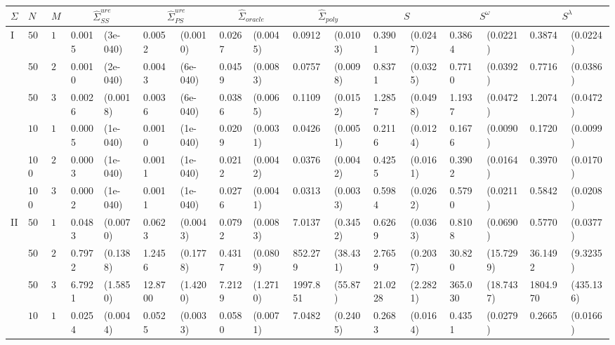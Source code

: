 \begin{table}[H]
\centering
\begin{footnotesize}
\begin{tabular}{lllllllllllllllll}
$\Sigma$ & $N$ & $M$ & \multicolumn{2}{c}{$\hat{\Sigma}^{ure}_{SS}$} &  \multicolumn{2}{c}{$\hat{\Sigma}^{ure}_{PS}$} &  \multicolumn{2}{c}{$\hat{\Sigma}_{oracle}$}   &  \multicolumn{2}{c}{$\hat{\Sigma}_{poly}$}  &  \multicolumn{2}{c}{$S$}   &  \multicolumn{2}{c}{$S^\omega$}   &  \multicolumn{2}{c}{$S^\lambda$}   \\ 
  \hline
I & $50$ & $10$ & 0.0015 & (3e-040) & 0.0052 & (0.0010) & 0.0267 & (0.0045) & 0.0912 & (0.0103) & 0.3901 & (0.0247) & 0.3864 & (0.0221) & 0.3874 & (0.0224) \\ 
    &  50 & $20$ & 0.0010 & (2e-040) & 0.0043 & (6e-040) & 0.0459 & (0.0083) & 0.0757 & (0.0098) & 0.8371 & (0.0325) & 0.7710 & (0.0392) & 0.7716 & (0.0386) \\ 
    & 50  & $30$ & 0.0026 & (0.0018) & 0.0036 & (6e-040) & 0.0386 & (0.0065) & 0.1109 & (0.0152) & 1.2857 & (0.0498) & 1.1937 & (0.0472) & 1.2074 & (0.0472) \\ 
    & $100$ & $10$ & 0.0005 & (1e-040) & 0.0010 & (1e-040) & 0.0209 & (0.0031) & 0.0426 & (0.0051) & 0.2116 & (0.0124) & 0.1676 & (0.0090) & 0.1720 & (0.0099) \\ 
    &  100 & $20$ & 0.0003 & (1e-040) & 0.0011 & (1e-040) & 0.0212 & (0.0042) & 0.0376 & (0.0042) & 0.4255 & (0.0161) & 0.3902 & (0.0164) & 0.3970 & (0.0170) \\ 
    & 100  & $30$ & 0.0002 & (1e-040) & 0.0011 & (1e-040) & 0.0276 & (0.0041) & 0.0313 & (0.0033) & 0.5984 & (0.0262) & 0.5790 & (0.0211) & 0.5842 & (0.0208) \\ 
  II & $50$ & $10$ & 0.0483 & (0.0070) & 0.0623 & (0.0043) & 0.0792 & (0.0083) & 7.0137 & (0.3452) & 0.6269 & (0.0363) & 0.8108 & (0.0690) & 0.5770 & (0.0377) \\ 
    &50   & $20$ & 0.7972 & (0.1388) & 1.2456 & (0.1778) & 0.4317 & (0.0809) & 852.279 & (38.431) & 2.7659 & (0.2037) & 30.820 & (15.7299) & 36.1492 & (9.3235) \\ 
    &   50& $30$ & 6.7921 & (1.5850) & 12.8700 & (1.4200) & 7.2129 & (1.2710) & 1997.851 & (55.87) & 21.0228 & (2.2821) & 365.030 & (18.7437) & 1804.970 & (435.136) \\ 
    & $100$ & $10$ & 0.0254 & (0.0044) & 0.0525 & (0.0033) & 0.0580 & (0.0071) & 7.0482 & (0.2405) & 0.2683 & (0.0164) & 0.4351 & (0.0279) & 0.2665 & (0.0166) \\ 

\end{tabular}
\end{footnotesize}
\end{table}
